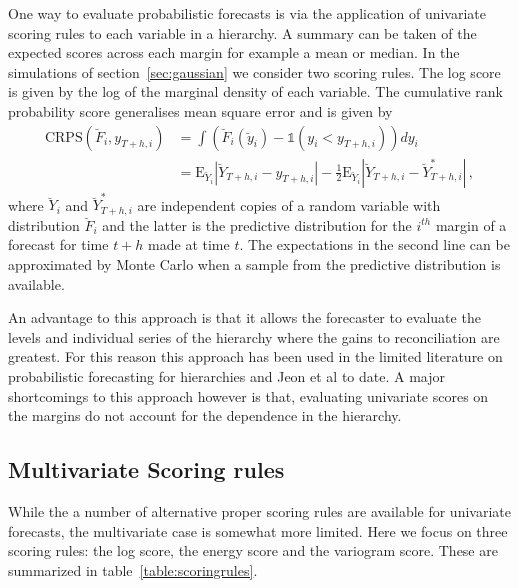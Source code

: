 \documentclass[a4paper, 11pt]{article}
\def\E{\text{E}}
\theoremstyle{theo}
\theoremstyle{definition}
\begin{document}
One way to evaluate probabilistic forecasts is via the application of univariate scoring rules to each variable in a hierarchy.  A summary can be taken of the expected scores across each margin for example a mean or median.  In the simulations of section~\ref{sec:gaussian} we consider two scoring rules.  The log score is given by the log of the marginal density of each variable.  The cumulative rank probability score generalises mean square error and is given by
\begin{align} \label{eq:CRPS}
\text{CRPS}(\breve{F}_i,y_{T+h,i}) &=\int \left(\breve{F}_i(\breve{y}_i)-\mathbb{1}(y_i<y_{T+h,i})\right)dy_i\\ &=\E_{\breve{Y}_i}|\breve{Y}_{T+h,i}-y_{T+h,i}| - \frac{1}{2}\E_{\breve{Y}_i}|\breve{Y}_{T+h,i}-\breve{Y}^*_{T+h,i}|\,,
\end{align}
where $\breve{Y}_i$ and $\breve{Y}^*_{T+h,i}$ are independent copies of a random variable with distribution $\breve{F}_i$ and the latter is the predictive distribution for the $i^{th}$ margin of a forecast for time $t+h$ made at time $t$. The expectations in the second line can be approximated by Monte Carlo when a sample from the predictive distribution is available.

An advantage to this approach is that it allows the forecaster to evaluate the levels and individual series of the hierarchy where the gains to reconciliation are greatest.  For this reason this approach has been used in the limited literature on probabilistic forecasting for hierarchies \cite{BenTaieb2017} and Jeon et al  to date.  A major shortcomings to this approach however is that, evaluating univariate scores on the margins do not account for the dependence in the hierarchy. 

\subsection{Multivariate Scoring rules}

While the a number of alternative proper scoring rules are available for univariate forecasts, the multivariate case is somewhat more limited.  Here we focus on three scoring rules: the log score, the energy score and the variogram score.  These are summarized in table~\ref{table:scoringrules}.
\end{document}
